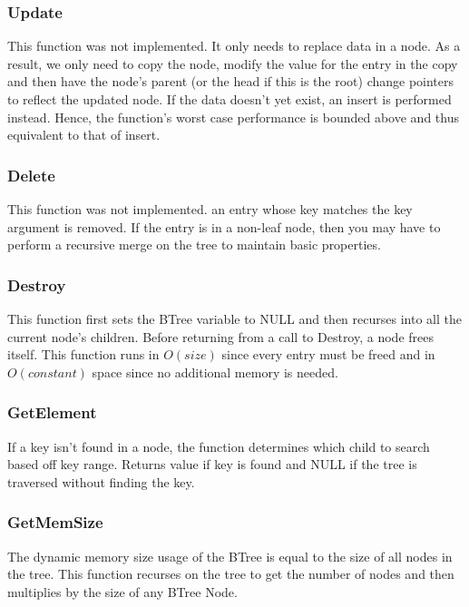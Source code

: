 \documentclass[twocolumn]{article}
\begin{document}
\subsubsection{Update}

This function was not implemented. It only needs to replace data in a node. As a
result, we only need to copy the node, modify the value for the entry in the
copy and then have the node's parent (or the head if this is the root) change
pointers to reflect the updated node. If the data doesn't yet exist, an insert
is performed instead. Hence, the function's worst case performance is bounded
above and thus equivalent to that of insert.

\subsubsection{Delete}

This function was not implemented. an entry whose key matches the key argument
is removed. If the entry is in a non-leaf node, then you may have to perform a
recursive merge on the tree to maintain basic properties.

\subsubsection{Destroy}

This function first sets the BTree variable to NULL and then recurses into all
the current node's children. Before returning from a call to Destroy, a node
frees itself. This function runs in $O(size)$ since every entry must be freed and
in $O(constant)$ space since no additional memory is needed.

\subsubsection{GetElement}

If a key isn't found in a node, the function determines which child to search
based off key range. Returns value if key is found and NULL if the tree is
traversed without finding the key.

\subsubsection{GetMemSize}

The dynamic memory size usage of the BTree is equal to the size of all nodes in
the tree. This function recurses on the tree to get the number of nodes and
then multiplies by the size of any BTree Node.
\end{document}
